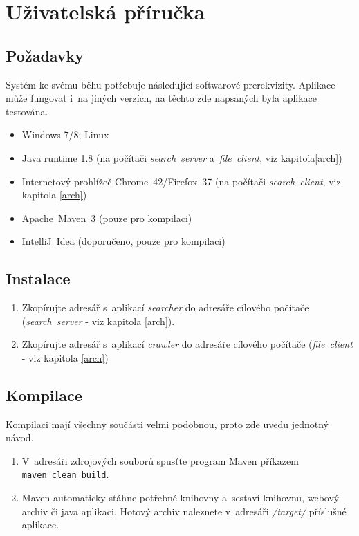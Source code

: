 \chapter{Uživatelská příručka}
\section{Požadavky}
Systém ke svému běhu potřebuje následující softwarové prerekvizity. Aplikace může fungovat i~na jiných verzích, na těchto zde napsaných byla aplikace testována.
\begin{itemize}
\item Windows 7/8; Linux
\item Java runtime 1.8 (na počítači \emph{search~server} a~\emph{file~client}, viz kapitola\ref{arch})
\item Internetový prohlížeč Chrome~42/Firefox~37 (na počítači \emph{search~client}, viz kapitola \ref{arch})
\item Apache~Maven~3 (pouze pro kompilaci)
\item IntelliJ~Idea (doporučeno, pouze pro kompilaci)
\end{itemize}

\section{Instalace}
\begin{enumerate}
\item Zkopírujte adresář s~aplikací \emph{searcher} do adresáře cílového počítače (\emph{search~server} - viz kapitola \ref{arch}).
\item Zkopírujte adresář s~aplikací \emph{crawler} do adresáře cílového počítače (\emph{file~client} - viz kapitola \ref{arch})
\end{enumerate}

\section{Kompilace}
Kompilaci mají všechny součásti velmi podobnou, proto zde uvedu jednotný návod.
\begin{enumerate}
\item V~adresáři zdrojových souborů spusťte program Maven příkazem \\ \verb|maven clean build|.
\item Maven automaticky stáhne potřebné knihovny a~sestaví knihovnu, webový archiv či java aplikaci. Hotový archiv naleznete v~adresáři \emph{/target/} příslušné aplikace.
\end{enumerate} 


